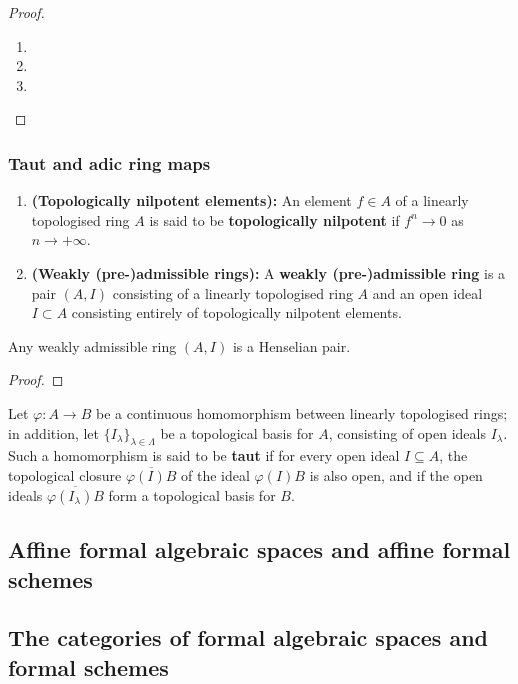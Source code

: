                 \begin{proof}
                    \noindent
                    \begin{enumerate}
                        \item 
                        \item 
                        \item 
                    \end{enumerate}
                \end{proof}
        
        \subsubsection{Taut and adic ring maps}
            \begin{definition} \label{def: weakly_pre_admissible_rings}
                \noindent
                \begin{enumerate}
                    \item \textbf{(Topologically nilpotent elements):} An element $f \in A$ of a linearly topologised ring $A$ is said to be \textbf{topologically nilpotent} if $f^n \to 0$ as $n \to +\infty$. 
                    \item \textbf{(Weakly (pre-)admissible rings):} A \textbf{weakly (pre-)admissible ring} is a pair $(A, I)$ consisting of a linearly topologised ring $A$ and an open ideal $I \subset A$ consisting entirely of topologically nilpotent elements. 
                \end{enumerate}
            \end{definition}
            \begin{proposition} \label{prop: weakly_admissible_rings_induce_henselian_pairs}
                Any weakly admissible ring $(A, I)$ is a Henselian pair.
            \end{proposition}
                \begin{proof}
                    
                \end{proof}
        
            \begin{definition} \label{def: taut_ring_maps}
                Let $\varphi: A \to B$ be a continuous homomorphism between linearly topologised rings; in addition, let $\{I_{\lambda}\}_{\lambda \in \Lambda}$ be a topological basis for $A$, consisting of open ideals $I_{\lambda}$. Such a homomorphism is said to be \textbf{taut} if for every open ideal $I \subseteq A$, the topological closure $\overline{\varphi(I)B}$ of the ideal $\varphi(I)B$ is also open, and if the open ideals $\overline{\varphi(I_{\lambda})B}$ form a topological basis for $B$.
            \end{definition}
        
    \subsection{Affine formal algebraic spaces and affine formal schemes}
    
    \subsection{The categories of formal algebraic spaces and formal schemes}